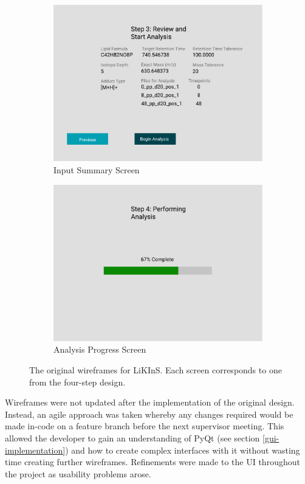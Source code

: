 \documentclass{l4proj}
\begin{document}
\begin{figure}[htb]
\begin{subfigure}{0.4\linewidth}
        \includegraphics[width=\linewidth]{dissertation/images/wireframes/wireframe3.pdf}
    \caption{Input Summary Screen}
        \end{subfigure}
        \begin{subfigure}{0.4\linewidth}
        \includegraphics[width=\linewidth]{dissertation/images/wireframes/wireframe4.pdf}
    \caption{Analysis Progress Screen}
    \end{subfigure}
    \caption{The original wireframes for LiKInS. Each screen corresponds to one from the four-step design.}
    \label{fig:wireframes}
\end{figure}


Wireframes were not updated after the implementation of the original design. Instead, an agile approach was taken whereby any changes required would be made in-code on a feature branch before the next supervisor meeting. This allowed the developer to gain an understanding of PyQt (see section \ref{gui-implementation}) and how to create complex interfaces with it without wasting time creating further wireframes. Refinements were made to the UI throughout the project as usability problems arose.
\end{document}
